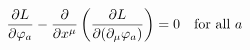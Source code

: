 \documentclass[preview]{standalone}
\begin{document}
\begin{align*}
\special{dvisvgm:raw <g id='unique000'>}\frac{\partial L}{\partial \varphi_a} - \frac{\partial}{\partial x^\mu}\left(\frac{\partial L}{\partial(\partial_\mu \varphi_a)}\right) = 0\quad \text{for all } a\special{dvisvgm:raw </g>}
\end{align*}
\end{document}
